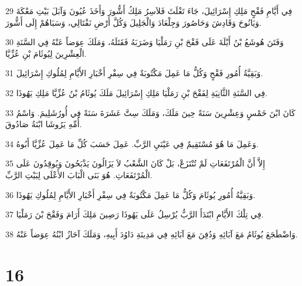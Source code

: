 \par 29 فِي أَيَّامِ فَقْحٍ مَلِكِ إِسْرَائِيلَ، جَاءَ تَغْلَثَ فَلاَسِرُ مَلِكُ أَشُّورَ وَأَخَذَ عُيُونَ وَآبَلَ بَيْتِ مَعْكَةَ وَيَانُوحَ وَقَادِشَ وَحَاصُورَ وَجِلْعَادَ وَالْجَلِيلَ وَكُلَّ أَرْضِ نَفْتَالِي، وَسَبَاهُمْ إِلَى أَشُّورَ.
\par 30 وَفَتَنَ هُوشَعُ بْنُ أَيْلَةَ عَلَى فَقْحَ بْنِ رَمَلْيَا وَضَرَبَهُ فَقَتَلَهُ، وَمَلَكَ عِوَضاً عَنْهُ فِي السَّنَةِ الْعِشْرِينَ لِيُوثَامَ بْنِ عُزِّيَّا.
\par 31 وَبَقِيَّةُ أُمُورِ فَقْحٍ وَكُلُّ مَا عَمِلَ مَكْتُوبَةٌ فِي سِفْرِ أَخْبَارِ الأَيَّامِ لِمُلُوكِ إِسْرَائِيلَ.
\par 32 فِي السَّنَةِ الثَّانِيَةِ لِفَقْحَ بْنِ رَمَلْيَا مَلِكِ إِسْرَائِيلَ مَلَكَ يُوثَامُ بْنُ عُزِّيَّا مَلِكِ يَهُوذَا.
\par 33 كَانَ ابْنَ خَمْسٍ وَعِشْرِينَ سَنَةً حِينَ مَلَكَ، وَمَلَكَ سِتَّ عَشَرَةَ سَنَةً فِي أُورُشَلِيمَ. وَاسْمُ أُمِّهِ يَرُوشَا ابْنَةُ صَادُوقَ.
\par 34 وَعَمِلَ مَا هُوَ مُسْتَقِيمٌ فِي عَيْنَيِ الرَّبِّ. عَمِلَ حَسَبَ كُلِّ مَا عَمِلَ عُزِّيَّا أَبُوهُ.
\par 35 إِلاَّ أَنَّ الْمُرْتَفَعَاتِ لَمْ تُنْتَزَعْ، بَلْ كَانَ الشَّعْبُ لاَ يَزَالُونَ يَذْبَحُونَ وَيُوقِدُونَ عَلَى الْمُرْتَفَعَاتِ. هُوَ بَنَى الْبَابَ الأَعْلَى لِبَيْتِ الرَّبِّ.
\par 36 وَبَقِيَّةُ أُمُورِ يُوثَامَ وَكُلُّ مَا عَمِلَ مَكْتُوبَةٌ فِي سِفْرِ أَخْبَارِ الأَيَّامِ لِمُلُوكِ يَهُوذَا.
\par 37 فِي تِلْكَ الأَيَّامِ ابْتَدَأَ الرَّبُّ يُرْسِلُ عَلَى يَهُوذَا رَصِينَ مَلِكَ أَرَامَ وَفَقْحَ بْنَ رَمَلْيَا.
\par 38 وَاضْطَجَعَ يُوثَامُ مَعَ آبَائِهِ وَدُفِنَ مَعَ آبَائِهِ فِي مَدِينَةِ دَاوُدَ أَبِيهِ، وَمَلَكَ آحَازُ ابْنُهُ عِوَضاً عَنْهُ.

\chapter{16}

